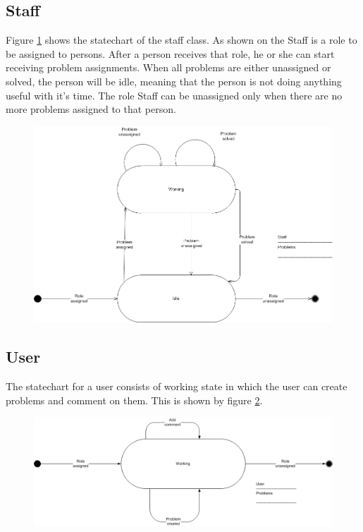 \subsection{Staff}
Figure \ref{fig:Klasse_diagram_staff} shows the statechart of the staff class. As shown on the Staff is a role to be assigned to persons. After a person receives that role, he or she can start receiving problem assignments. When all problems are either unassigned or solved, the person will be idle, meaning that the person is not doing anything useful with it's time. The role Staff can be unassigned only when there are no more problems assigned to that person.
\begin{figure}[H]
\begin{center}
\includegraphics[width=1\textwidth]{input/problem_domain_analysis/Klassediagram_staff.jpg}
\label{fig:Klasse_diagram_staff}
\end{center}
\end{figure}

\subsection{User}
The statechart for a user consists of working state in which the user can create problems and comment on them. This is shown by figure \ref{fig:Klasse_diagram_user}.
\begin{figure}[H]
\begin{center}
\includegraphics[width=1\textwidth]{input/problem_domain_analysis/Klassediagram_user.jpg}
\label{fig:Klasse_diagram_user}
\end{center}
\end{figure}


